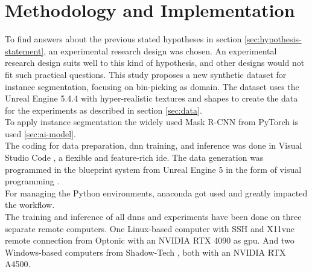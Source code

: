 \chapter{Methodology and Implementation}
\label{chap:kapitel3}
	To find answers about the previous stated hypotheses in section \ref{sec:hypothesis-statement}, an experimental research design was chosen. An experimental research design suits well to this kind of hypothesis, and other designs would not fit such practical questions. This study proposes a new synthetic dataset for instance segmentation, focusing on bin-picking as domain. The dataset uses the Unreal Engine 5.4.4 \cite{ue5} with hyper-realistic textures and shapes to create the data for the experiments as described in section \ref{sec:data}.\\
	To apply instance segmentation the widely used Mask R-CNN \cite{Kaiming2017} from PyTorch \cite{pytorch} is used \ref{sec:ai-model}.\\
	The coding for data preparation, \ac{dnn} training, and inference was done in Visual Studio Code \cite{vscode}, a flexible and feature-rich \ac{ide}. The data generation was programmed in the blueprint system from Unreal Engine 5 \cite{ue5} in the form of visual programming \cite{Romero2022}.\\
	For managing the Python environments, anaconda \cite{anaconda} got used and greatly impacted the workflow.\\
	The training and inference of all \ac{dnn}s and experiments have been done on three separate remote computers. One Linux-based computer with SSH and X11vnc remote connection from Optonic \cite{optonic} with an NVIDIA RTX 4090 as \ac{gpu}. And two Windows-based computers from Shadow-Tech \cite{shadow}, both with an NVIDIA RTX A4500.

	
	
	
